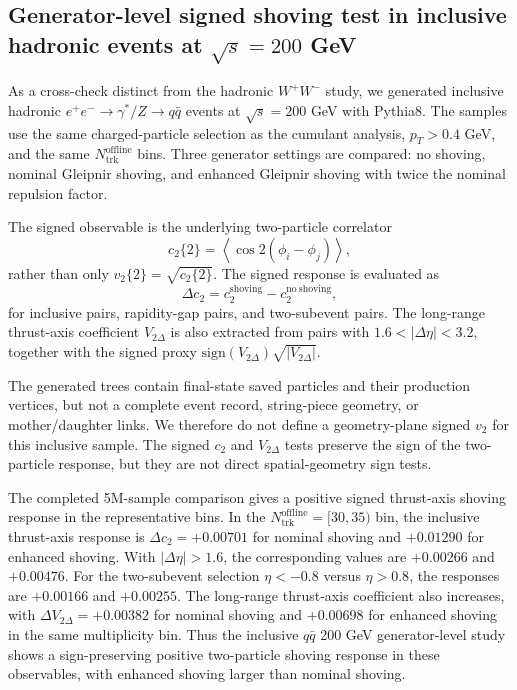 \subsection{Generator-level signed shoving test in inclusive hadronic events at \texorpdfstring{$\sqrt{s}=200$ GeV}{sqrt(s)=200 GeV}}
\label{sec:qq200-signed-generator-test}

As a cross-check distinct from the hadronic \(W^+W^-\) study, we generated inclusive
hadronic \(e^+e^- \to \gamma^*/Z \to q\bar{q}\) events at \(\sqrt{s}=200\) GeV with
Pythia8.  The samples use the same charged-particle selection as the cumulant analysis,
\(p_T>0.4\) GeV, and the same \(N_{\mathrm{trk}}^{\mathrm{offline}}\) bins.  Three
generator settings are compared: no shoving, nominal Gleipnir shoving, and enhanced
Gleipnir shoving with twice the nominal repulsion factor.

The signed observable is the underlying two-particle correlator
\[
  c_2\{2\}=\left<\cos 2(\phi_i-\phi_j)\right>,
\]
rather than only \(v_2\{2\}=\sqrt{c_2\{2\}}\).  The signed response is evaluated as
\[
  \Delta c_2 = c_2^{\mathrm{shoving}} - c_2^{\mathrm{no~shoving}},
\]
for inclusive pairs, rapidity-gap pairs, and two-subevent pairs.  The long-range
thrust-axis coefficient \(V_{2\Delta}\) is also extracted from pairs with
\(1.6<|\Delta\eta|<3.2\), together with the signed proxy
\(\mathrm{sign}(V_{2\Delta})\sqrt{|V_{2\Delta}|}\).

The generated trees contain final-state saved particles and their production vertices,
but not a complete event record, string-piece geometry, or mother/daughter links.  We
therefore do not define a geometry-plane signed \(v_2\) for this inclusive sample.
The signed \(c_2\) and \(V_{2\Delta}\) tests preserve the sign of the two-particle
response, but they are not direct spatial-geometry sign tests.

The completed 5M-sample comparison gives a positive signed thrust-axis shoving
response in the representative bins.  In the
\(N_{\mathrm{trk}}^{\mathrm{offline}}=[30,35)\) bin, the inclusive thrust-axis
response is \(\Delta c_2=+0.00701\) for nominal shoving and \(+0.01290\) for
enhanced shoving.  With \(|\Delta\eta|>1.6\), the corresponding values are
\(+0.00266\) and \(+0.00476\).  For the two-subevent selection
\(\eta<-0.8\) versus \(\eta>0.8\), the responses are \(+0.00166\) and
\(+0.00255\).  The long-range thrust-axis coefficient also increases, with
\(\Delta V_{2\Delta}=+0.00382\) for nominal shoving and \(+0.00698\) for
enhanced shoving in the same multiplicity bin.  Thus the inclusive
\(q\bar{q}\) 200 GeV generator-level study shows a sign-preserving positive
two-particle shoving response in these observables, with enhanced shoving larger
than nominal shoving.

